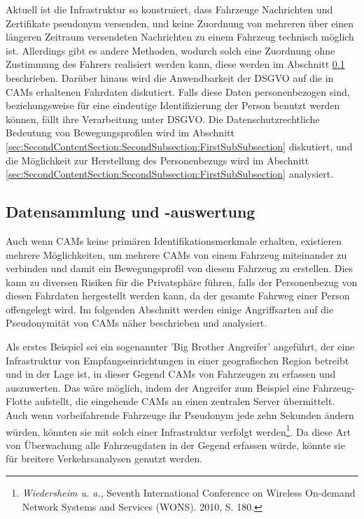 Aktuell ist die Infrastruktur so konstruiert, dass Fahrzeuge Nachrichten und Zertifikate pseudonym versenden, und keine Zuordnung von mehreren über einen längeren Zeitraum versendeten Nachrichten zu einem Fahrzeug technisch möglich ist. Allerdings gibt es andere Methoden, wodurch solch eine Zuordnung ohne Zustimmung des Fahrers realisiert werden kann, diese werden im Abschnitt \ref{sec:FirstContentSection:ThirdSubSection} beschrieben. Darüber hinaus wird die Anwendbarkeit der DSGVO auf die in CAMs erhaltenen Fahrdaten diskutiert. Falls diese Daten personenbezogen sind, beziehungsweise für eine eindeutige Identifizierung der Person benutzt werden können, fällt ihre Verarbeitung unter DSGVO. Die Datenschutzrechtliche Bedeutung von Bewegungsprofilen wird im Abschnitt \ref{sec:SecondContentSection:SecondSubsection:FirstSubSubsection} diskutiert, und die Möglichkeit zur Herstellung des Personenbezugs wird im Abschnitt \ref{sec:SecondContentSection:SecondSubsection:FirstSubSubsection} analysiert.

\subsection{Datensammlung und -auswertung}
\label{sec:FirstContentSection:ThirdSubSection}

Auch wenn CAMs keine primären Identifikationsmerkmale erhalten, existieren mehrere Möglichkeiten, um mehrere CAMs von einem Fahrzeug miteinander zu verbinden und damit ein Bewegungsprofil von diesem Fahrzeug zu erstellen. Dies kann zu diversen Risiken für die Privatsphäre führen, falls der Personenbezug von diesen Fahrdaten hergestellt werden kann, da der gesamte Fahrweg einer Person offengelegt wird. Im folgenden Abschnitt werden einige Angriffsarten auf die Pseudonymität von CAMs näher beschrieben und analysiert. 

Als erstes Beispiel sei ein sogenannter 'Big Brother Angreifer' angeführt, der eine Infrastruktur von Empfangseinrichtungen in einer geografischen Region betreibt und in der Lage ist, in dieser Gegend CAMs von Fahrzeugen zu erfassen und auszuwerten. Das wäre möglich, indem der Angreifer zum Beispiel eine Fahrzeug-Flotte aufstellt, die eingehende CAMs an einen zentralen Server übermittelt. Auch wenn vorbeifahrende Fahrzeuge ihr Pseudonym jede zehn Sekunden ändern würden, könnten sie mit solch einer Infrastruktur verfolgt werden\footnote{\emph{Wiedersheim u. a.}, Seventh International Conference on Wireless On-demand Network Systems and Services (WONS). 2010, S. 180.}\nocite{Wiedersheim2010}. Da diese Art von Überwachung alle Fahrzeugdaten in der Gegend erfassen würde, könnte sie für breitere Verkehrsanalysen genutzt werden.

